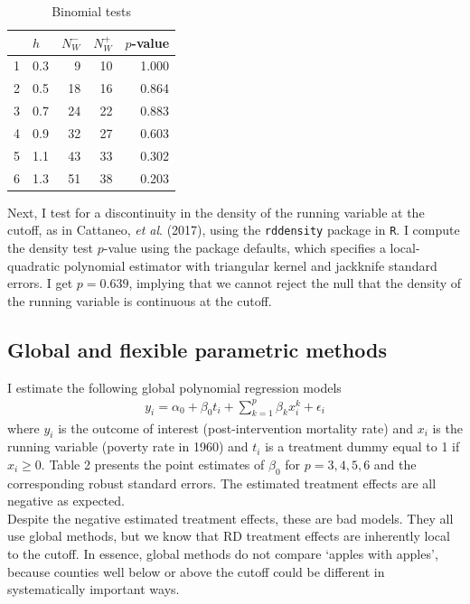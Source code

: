 \documentclass[12pt]{article}
\newcommand{\e}{\epsilon}
\begin{document}
\begin{table}[htpb!]
\centering
\caption{Binomial tests}
\begin{tabular}{llrrr}
  \hline
 & $h$ & $N_W^-$ & $N_W^+$ & $p$-value \\ 
  \hline
1 & 0.3 & 9 & 10 & 1.000 \\ 
  2 & 0.5 & 18 & 16 & 0.864 \\ 
  3 & 0.7 & 24 & 22 & 0.883 \\ 
  4 & 0.9 & 32 & 27 & 0.603 \\ 
  5 & 1.1 & 43 & 33 & 0.302 \\ 
  6 & 1.3 & 51 & 38 & 0.203 \\ 
   \hline
\end{tabular}
\end{table}

Next, I test for a discontinuity in the density of the running variable at the cutoff, as in Cattaneo, \textit{et al}. (2017), using the \verb|rddensity| package in \verb|R|. I compute the density test $p$-value using the package defaults, which specifies a local-quadratic polynomial estimator with triangular kernel and jackknife standard errors. I get $p = 0.639$, implying that we cannot reject the null that the density of the running variable is continuous at the cutoff.

\subsection{Global and flexible parametric methods}
I estimate the following global polynomial regression models
\begin{align*}
y_i = \alpha_0 + \beta_0 t_i + \sum_{k=1}^p \beta_k x_i^k + \e_i
\end{align*}
where $y_i$ is the outcome of interest (post-intervention mortality rate) and $x_i$ is the running variable (poverty rate in 1960) and $t_i$ is a treatment dummy equal to 1 if $x_i \geq 0$. Table 2 presents the point estimates of $\beta_0$ for $p=3,4,5,6$ and the corresponding robust standard errors. The estimated treatment effects are all negative as expected. \\

Despite the negative estimated treatment effects, these are bad models. They all use global methods, but we know that RD treatment effects are inherently local to the cutoff. In essence, global methods do not compare `apples with apples', because counties well below or above the cutoff could be different in systematically important ways.
\end{document}
